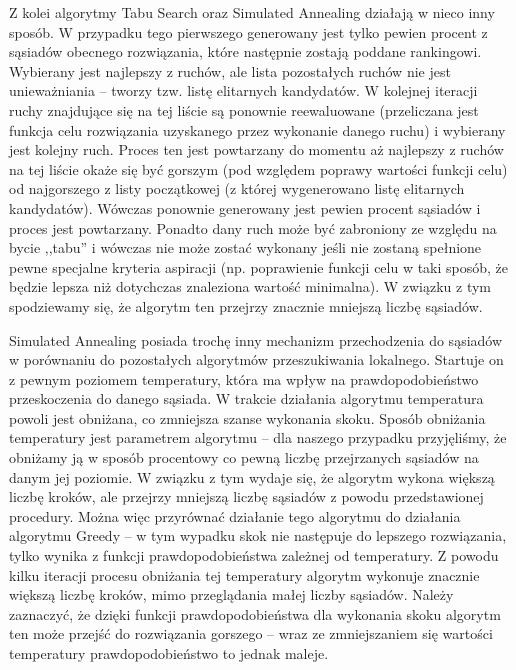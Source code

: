 Z kolei algorytmy Tabu Search oraz Simulated Annealing działają w nieco inny sposób. W przypadku tego pierwszego generowany jest tylko pewien procent z sąsiadów obecnego rozwiązania, które następnie zostają poddane rankingowi. Wybierany jest najlepszy z ruchów, ale lista pozostałych ruchów nie jest unieważniania -- tworzy tzw. listę elitarnych kandydatów. W kolejnej iteracji ruchy znajdujące się na tej liście są ponownie reewaluowane (przeliczana jest funkcja celu rozwiązania uzyskanego przez wykonanie danego ruchu) i wybierany jest kolejny ruch. Proces ten jest powtarzany do momentu aż najlepszy z ruchów na tej liście okaże się być gorszym (pod względem poprawy wartości funkcji celu) od najgorszego z listy początkowej (z której wygenerowano listę elitarnych kandydatów). Wówczas ponownie generowany jest pewien procent sąsiadów i proces jest powtarzany. Ponadto dany ruch może być zabroniony ze względu na bycie ,,tabu'' i wówczas nie może zostać wykonany jeśli nie zostaną spełnione pewne specjalne kryteria aspiracji (np. poprawienie funkcji celu w taki sposób, że będzie lepsza niż dotychczas znaleziona wartość minimalna). W związku z tym spodziewamy się, że algorytm ten przejrzy znacznie mniejszą liczbę sąsiadów.

Simulated Annealing posiada trochę inny mechanizm przechodzenia do sąsiadów w porównaniu do pozostałych algorytmów przeszukiwania lokalnego. Startuje on z pewnym poziomem temperatury, która ma wpływ na prawdopodobieństwo przeskoczenia do danego sąsiada. W trakcie działania algorytmu temperatura powoli jest obniżana, co zmniejsza szanse wykonania skoku. Sposób obniżania temperatury jest parametrem algorytmu -- dla naszego przypadku przyjęliśmy, że obniżamy ją w sposób procentowy co pewną liczbę przejrzanych sąsiadów na danym jej poziomie. W związku z tym wydaje się, że algorytm wykona większą liczbę kroków, ale przejrzy mniejszą liczbę sąsiadów z powodu przedstawionej procedury. Można więc przyrównać działanie tego algorytmu do działania algorytmu Greedy -- w tym wypadku skok nie następuje do lepszego rozwiązania, tylko wynika z funkcji prawdopodobieństwa zależnej od temperatury. Z powodu kilku iteracji procesu obniżania tej temperatury algorytm wykonuje znacznie większą liczbę kroków, mimo przeglądania małej liczby sąsiadów. Należy zaznaczyć, że dzięki funkcji prawdopodobieństwa dla wykonania skoku algorytm ten może przejść do rozwiązania gorszego -- wraz ze zmniejszaniem się wartości temperatury prawdopodobieństwo to jednak maleje.

